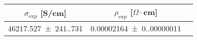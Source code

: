 \begin{tabular}{ccc}
\toprule
$\sigma_{\exp}$ [S/cm] & $\rho_{\exp}$ [$\Omega  \cdot$cm] \\
\midrule
\num{46217.527(241.731)} & \num{0.00002164(0.00000011)} \\
\bottomrule
\end{tabular}
